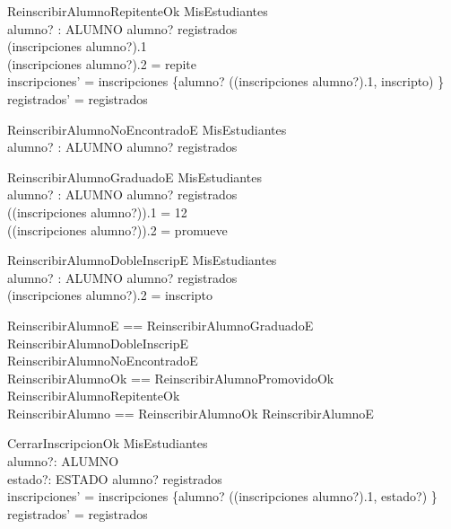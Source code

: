 \begin{schema}{ReinscribirAlumnoRepitenteOk}
    \Delta MisEstudiantes \\
    alumno? : ALUMNO
    \where
    alumno? \in registrados \\
    (inscripciones \; alumno?).1  \\ 
    (inscripciones \; alumno?).2 = repite \\
    inscripciones' = inscripciones \oplus \{alumno? \mapsto ((inscripciones \; alumno?).1, inscripto) \} \\
    registrados' = registrados
\end{schema}

\begin{schema}{ReinscribirAlumnoNoEncontradoE}
    \Xi MisEstudiantes \\
    alumno? : ALUMNO
    \where
    alumno? \notin registrados
\end{schema}

\begin{schema}{ReinscribirAlumnoGraduadoE}
    \Xi MisEstudiantes \\
    alumno? : ALUMNO
    \where
    alumno? \in registrados \\
    ((inscripciones \; alumno?)).1 = 12 \\
    ((inscripciones \; alumno?)).2 = promueve 
\end{schema}

\begin{schema}{ReinscribirAlumnoDobleInscripE}
    \Xi MisEstudiantes \\
    alumno? : ALUMNO
    \where
    alumno? \in registrados \\
    (inscripciones \; alumno?).2 = inscripto
\end{schema}

\begin{zed}
    ReinscribirAlumnoE == ReinscribirAlumnoGraduadoE \lor ReinscribirAlumnoDobleInscripE \\
                             \lor ReinscribirAlumnoNoEncontradoE \\
    ReinscribirAlumnoOk == ReinscribirAlumnoPromovidoOk \lor ReinscribirAlumnoRepitenteOk \\
    ReinscribirAlumno == ReinscribirAlumnoOk \lor ReinscribirAlumnoE
\end{zed}

\begin{schema}{CerrarInscripcionOk}
    \Delta MisEstudiantes \\
    alumno?: ALUMNO \\
    estado?: ESTADO
    \where
    alumno? \in registrados \\
    inscripciones' = inscripciones \oplus \{alumno? \mapsto ((inscripciones \; alumno?).1, estado?) \} \\
    registrados' = registrados
\end{schema}

